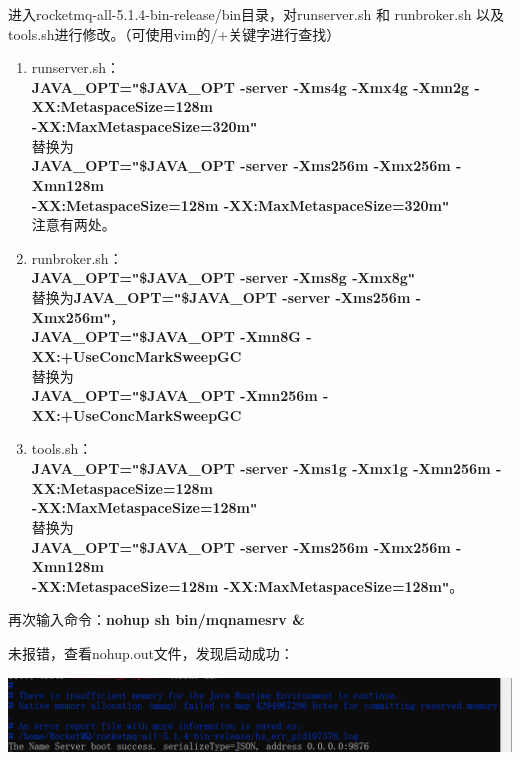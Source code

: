 \documentclass[11pt, a4paper, oneside, fontset=none]{ctexbook}
\begin{document}
进入rocketmq-all-5.1.4-bin-release/bin目录，对runserver.sh 和 runbroker.sh 以及 tools.sh进行修改。（可使用vim的/+关键字进行查找）
\begin{enumerate}
  \item runserver.sh：
  \\{\bfseries\kaishu JAVA\_OPT=\texttt{"}\${JAVA\_OPT} -server -Xms4g -Xmx4g -Xmn2g -XX:MetaspaceSize=128m 
  \\-XX:MaxMetaspaceSize=320m\texttt{"}}
  \\替换为
  \\{\bfseries\kaishu JAVA\_OPT=\texttt{"}\${JAVA\_OPT} -server -Xms256m -Xmx256m -Xmn128m 
  \\-XX:MetaspaceSize=128m -XX:MaxMetaspaceSize=320m\texttt{"}}
  \\注意有两处。
  \item runbroker.sh：
  \\{\bfseries\kaishu JAVA\_OPT=\texttt{"}\${JAVA\_OPT} -server -Xms8g -Xmx8g\texttt{"}}
  \\替换为{\bfseries\kaishu JAVA\_OPT=\texttt{"}\${JAVA\_OPT} -server -Xms256m -Xmx256m\texttt{"}}，
  \\{\bfseries\kaishu JAVA\_OPT=\texttt{"}\${JAVA\_OPT} -Xmn8G -XX:+UseConcMarkSweepGC }
  \\替换为
  \\{\bfseries\kaishu JAVA\_OPT=\texttt{"}\${JAVA\_OPT} -Xmn256m -XX:+UseConcMarkSweepGC }
  \item tools.sh：
  \\{\bfseries\kaishu JAVA\_OPT=\texttt{"}\${JAVA\_OPT} -server -Xms1g -Xmx1g -Xmn256m -XX:MetaspaceSize=128m 
  \\-XX:MaxMetaspaceSize=128m\texttt{"}}
  \\替换为
  \\{\bfseries\kaishu JAVA\_OPT=\texttt{"}\${JAVA\_OPT} -server -Xms256m -Xmx256m -Xmn128m 
  \\-XX:MetaspaceSize=128m -XX:MaxMetaspaceSize=128m\texttt{"}}。
\end{enumerate}

再次输入命令：{\bfseries\kaishu nohup sh bin/mqnamesrv \&}

未报错，查看nohup.out文件，发现启动成功：
\begin{center}
  \begin{minipage}{\textwidth}
    \center
    \includegraphics[width=\textwidth]{picture/名称服务器启动成功.png}
    \captionsetup{hypcap=false}
    \label{fig:名称服务器启动成功}
  \end{minipage}
\end{center}
\end{document}
